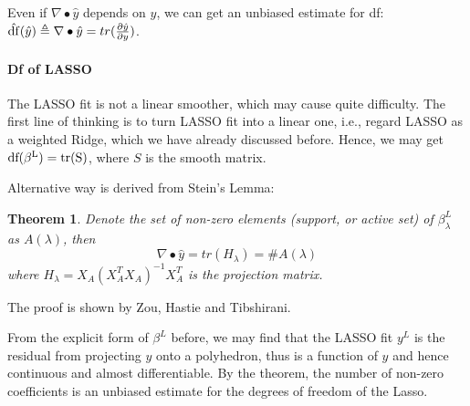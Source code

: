 \documentclass[]{article}
\newtheorem{mythm}{Theorem}%
\begin{document}
Even if $ \nabla\bullet\hat{y} $ depends on $ y $, we can get an unbiased estimate for \rm df: $ \hat{\rm df}(\hat{y})\triangleq\nabla\bullet\hat{y}=tr(\frac{\partial \hat{y}}{\partial y}) $.

\paragraph{Df of LASSO}
The LASSO  fit is not a linear smoother, which may cause quite difficulty. The first line of thinking is to turn LASSO fit into a linear one, i.e., regard LASSO as a weighted Ridge, which we have already discussed before. Hence, we may get $ \rm df(\beta^L)=tr(S) $, where $ S $ is the smooth matrix.

Alternative way is derived from Stein's Lemma:
\begin{mythm}
	Denote the set of non-zero elements (support, or active set) of $ \beta_{\lambda}^L $ as $ A(\lambda) $, then
	\begin{equation}
	\nabla\bullet\hat{y}=tr(H_{\lambda})=\#{A(\lambda)}
	\end{equation}
	where $ H_{\lambda}=X_A(X_A^TX_A)^{-1}X_A^T $ is the projection matrix.
\end{mythm}

The proof is shown by Zou, Hastie and Tibshirani\cite{zou2007degrees}.

From the explicit form of $ \beta^L $ before, we may find that the LASSO fit $ y^L $ is the residual from projecting $ y $ onto a polyhedron, thus is a function of $ y $ and hence continuous and almost differentiable. By the theorem, the number of non-zero coefficients is an unbiased estimate for the degrees of freedom of the Lasso.
\end{document}
